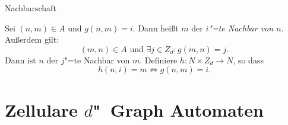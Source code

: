 \documentclass[18pt]{beamer}
\newcommand{\defWord}[1]{\emph{#1}}
\begin{document}
\begin{frame}{Nachbarschaft}
	\begin{definition}[Nachbarschaft]
		Sei $\left(n, m\right) \in A$ und $g\left(n, m\right) = i$. 
		Dann heißt $m$ der \defWord{$i$"=te Nachbar von $n$}.
		Außerdem gilt: 
		\begin{displaymath}
		\left(m, n\right) \in A \text{ und }\exists j \in Z_d : g(m, n) = j.
		\end{displaymath}
		Dann ist $n$ der $j$"=te Nachbar von $m$. 
		Definiere $h : N \times Z_d \rightarrow N$, so dass
		\begin{displaymath}
		h(n, i) = m \iff g(n, m) = i.
		\end{displaymath}
	\end{definition}
\end{frame}

\section{Zellulare $d$"~Graph Automaten}
\end{document}
